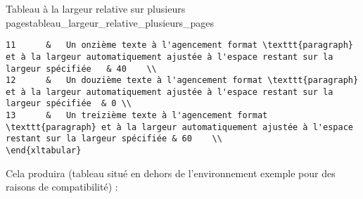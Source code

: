 \documentclass[a4paper, 11pt, twoside, fleqn]{memoir}
\begin{document}
\begin{exemple}{Tableau à la largeur relative sur plusieurs pages}{tableau_largeur_relative_plusieurs_pages}
\begin{verbatim}
11		&	Un onzième texte à l'agencement format \texttt{paragraph} et à la largeur automatiquement ajustée à l'espace restant sur la largeur spécifiée	& 40	\\
12		&	Un douzième texte à l'agencement format \texttt{paragraph} et à la largeur automatiquement ajustée à l'espace restant sur la largeur spécifiée	& 0	\\
13		&	Un treizième texte à l'agencement format \texttt{paragraph} et à la largeur automatiquement ajustée à l'espace restant sur la largeur spécifiée	& 60	\\
\end{xltabular}
\end{verbatim}

Cela produira (tableau situé en dehors de l'environnement exemple pour des raisons de compatibilité) :\\

\end{exemple}
\end{document}
